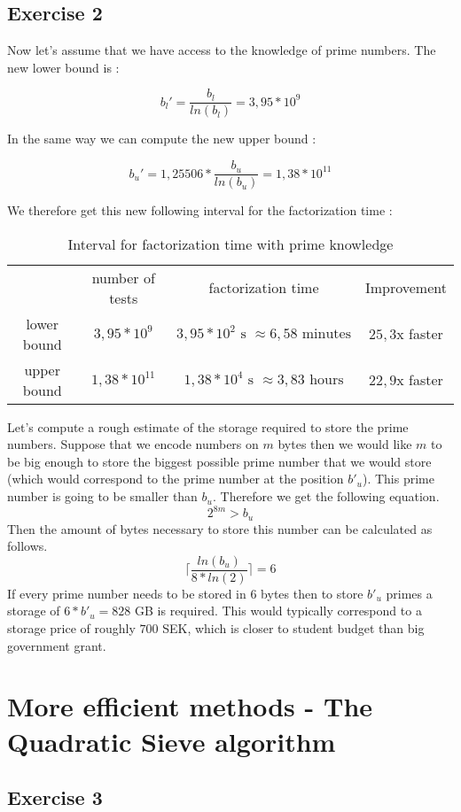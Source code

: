 \documentclass{article}
\begin{document}
\subsection{Exercise 2}

Now let's assume that we have access to the knowledge of prime numbers. The new lower bound is :

$$b_l'=\frac{b_l}{ln(b_l)}=3,95*10^9$$

In the same way we can compute the new upper bound :

$$b_u'=1,25506*\frac{b_u}{ln(b_u)}=1,38*10^{11}$$

We therefore get this new following interval for the factorization time :

\begin{table}[H]
    \centering
    \begin{tabular}{c|c|c|c}
         & number of tests & factorization time & Improvement \\
        lower bound & $3,95*10^9$ & $3,95*10^{2} \text{ s } \approx 6,58 \text{ minutes}$ & $25,3$x faster \\
        upper bound & $1,38*10^{11}$ & $1,38*10^{4} \text{ s } \approx 3,83 \text{ hours}$ & $22,9$x faster
    \end{tabular}
    \caption{Interval for factorization time with prime knowledge}
\end{table}

Let's compute a rough estimate of the storage required to store the prime numbers. Suppose that we encode numbers on $m$ bytes then we would like $m$ to be big enough to store the biggest possible prime number that we would store (which would correspond to the prime number at the position $b'_u$). This prime number is going to be smaller than $b_u$. Therefore we get the following equation.
$$2^{8m} > b_u$$
Then the amount of bytes necessary to store this number can be calculated as follows.
$$\lceil\frac{ln(b_u)}{8*ln(2)}\rceil=6$$
If every prime number needs to be stored in 6 bytes then to store $b'_u$ primes a storage of $6*b'_u = 828$ GB is required. This would typically correspond to a storage price of roughly $700$ SEK, which is closer to student budget than big government grant.

\section{More efficient methods - The Quadratic Sieve algorithm}

\subsection{Exercise 3}
\end{document}
